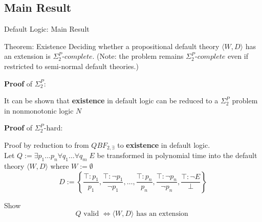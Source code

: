 \documentclass[usenames,dvipsnames, 8pt]{beamer}
\let\lneg\neg
\begin{document}
\subsection{Main Result}

\begin{frame}{Default Logic: Main Result}

\begin{block}{Theorem: Existence}
Deciding whether a propositional default theory $\langle W, D \rangle$ has an extension is $\Sigma_2^P\textit{-complete}$. (Note: the problem remains $\Sigma_2^P\textit{-complete}$ even if restricted to semi-normal default theories.) 
\end{block}
\textbf{Proof} of $\Sigma_2^P$: 

It can be shown that \textbf{existence} in default logic can be reduced to a $\Sigma_2^P$ problem in nonmonotonic logic $N$


\textbf{Proof} of $\Sigma_2^P\text{-hard}$:

Proof by reduction to from $QBF_{2,\exists}$ to \textbf{existence} in default logic. \\
Let $Q:= \exists p_1 \dots p_n \forall q_1 \dots \forall q_m \; E$ be transformed in polynomial time into the default theory $\langle W, D\rangle$ where $W:=\emptyset$
\begin{equation*}
D:=\left\lbrace \frac{\top:p_1}{p_1},  \frac{\top:\lneg p_1}{\lneg p_1}, \dots, \frac{\top:p_n}{p_n},  \frac{\top:\lneg p_n}{\lneg p_n}, \frac{\top:\lneg E}{\bot}\right\rbrace
\end{equation*}

Show
\begin{equation*}
Q \text{ valid } \iff \langle W, D\rangle \text{ has an extension }
\end{equation*}
\end{frame}
\end{document}
